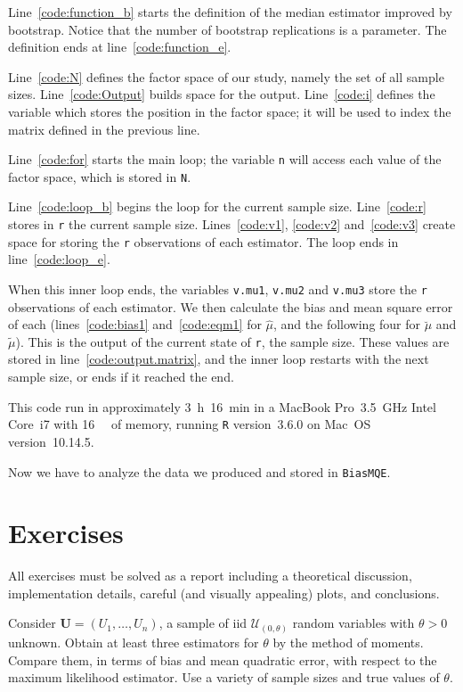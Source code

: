Line~\ref{code:function_b} starts the definition of the median estimator improved by bootstrap.
Notice that the number of bootstrap replications is a parameter.
The definition ends at line~\ref{code:function_e}.

Line~\ref{code:N} defines the factor space of our study, namely the set of all sample sizes.
Line~\ref{code:Output} builds space for the output.
Line~\ref{code:i} defines the variable which stores the position in the factor space; it will be used to index the matrix defined in the previous line.

Line~\ref{code:for} starts the main loop; the variable \verb|n| will access each value of the factor space, which is stored in \verb|N|.

Line~\ref{code:loop_b} begins the loop for the current sample size.
Line~\ref{code:r} stores in \verb|r| the current sample size.
Lines~\ref{code:v1}, \ref{code:v2} and~\ref{code:v3} create space for storing the \verb|r| observations of each estimator.
The loop ends in line~\ref{code:loop_e}.

When this inner loop ends, the variables \verb|v.mu1|, \verb|v.mu2| and \verb|v.mu3| store the \verb|r| observations of each estimator.
We then calculate the bias and mean square error of each (lines~\ref{code:bias1} and~\ref{code:eqm1} for $\widehat{\mu}$, and the following four for $\breve{\mu}$ and $\widetilde{\mu}$).
This is the output of the current state of \verb|r|, the sample size.
These values are stored in line~\ref{code:output.matrix}, and the inner loop restarts with the next sample size, or ends if it reached the end.

This code run in approximately \SI{3}{\hour}~\SI{16}{\minute}
in a MacBook Pro~\SI{3.5}{\giga\hertz} Intel Core~i7 with \SI{16}{\giga\byte} of memory,
running \texttt R version~3.6.0 on Mac~OS version~10.14.5.

Now we have to analyze the data we produced and stored in \verb|BiasMQE|.

\section*{Exercises}

All exercises must be solved as a report including a theoretical discussion, implementation details, careful (and visually appealing) plots, and conclusions.

\begin{exer}\label{Ex:Uiid}
Consider $\bm U=(U_1,\dots,U_n)$, a sample of iid $\mathcal U_{(0,\theta)}$ random variables with $\theta>0$ unknown.
Obtain at least three estimators for $\theta$ by the method of moments.
Compare them, in terms of bias and mean quadratic error, with respect to the maximum likelihood estimator.
Use a variety of sample sizes and true values of $\theta$.
\end{exer}

